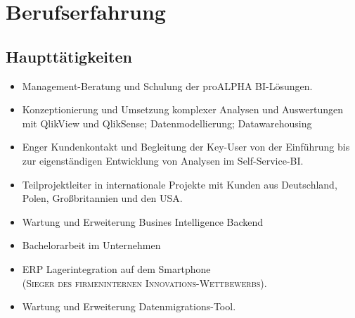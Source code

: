 


%







\makecvtitle %

\section{Berufserfahrung}

\subsection{Hauptt\"atigkeiten}

{
	\begin{itemize}
		\item Management-Beratung und Schulung der proALPHA BI-L\"osungen. 
		\item Konzeptionierung und Umsetzung komplexer Analysen und Auswertungen mit QlikView und QlikSense; Datenmodellierung; Datawarehousing 
		\item Enger Kundenkontakt und Begleitung der Key-User von der Einf\"uhrung bis zur eigenst\"andigen Entwicklung von Analysen im Self-Service-BI. 
		\item Teilprojektleiter in internationale Projekte mit Kunden aus Deutschland, Polen, Gro\ss britannien und den USA. 
	\end{itemize}}

{ 
	\begin{itemize} 
		\item Wartung und Erweiterung Busines Intelligence Backend
		\item Bachelorarbeit im Unternehmen
		\item ERP Lagerintegration auf dem Smartphone\\ \textsc{(Sieger des firmeninternen Innovations-Wettbewerbs)}.
		\item Wartung und Erweiterung Datenmigrations-Tool. 
	\end{itemize}}

